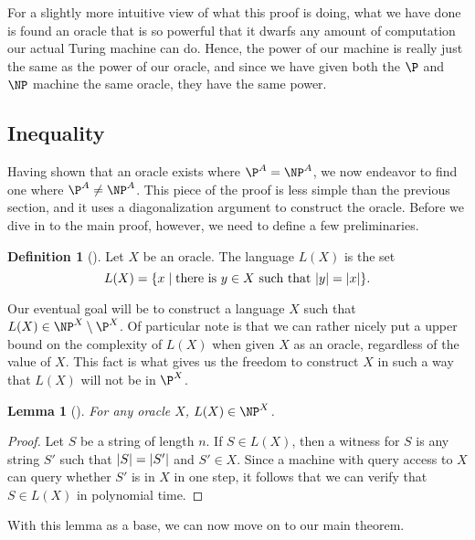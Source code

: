\documentclass{reedthesis}
\theoremstyle{plain}
\newtheorem{lemma}[thm]{Lemma}
\theoremstyle{definition}
\newtheorem{defn}[thm]{Definition}
\theoremstyle{remark}
\DeclarePairedDelimiter{\abs}{\lvert}{\rvert}
\numberwithin{equation}{section}
\begin{document}
For a slightly more intuitive view of what this proof is doing, what we have
done is found an oracle that is so powerful that it dwarfs any amount of
computation our actual Turing machine can do. Hence, the power of our machine is
really just the same as the power of our oracle, and since we have given both
the $\P$ and $\NP$ machine the same oracle, they have the same power.

\subsection{Inequality}

Having shown that an oracle exists where $\P^{A} = \NP^{A}$, we now endeavor to
find one where $\P^{A} \ne \NP^{A}$. This piece of the proof is less simple than
the previous section, and it uses a diagonalization argument to construct the
oracle. Before we dive in to the main proof, however, we need to define a few
preliminaries.

\begin{defn}[{\cite[436]{BGS75}}]\label{def:l(x)}
  Let $X$ be an oracle. The language $L(X)$ is the set
  \begin{equation*}
    L(X) = \{x \mid \text{there is } y \in X \text{ such that } \abs{y} = \abs{x}\}.
  \end{equation*}
\end{defn}

Our eventual goal will be to construct a language $X$ such that
$L(X) \in \NP^{X} \setminus \P^{X}$. Of particular note is that we can rather nicely put a
upper bound on the complexity of $L(X)$ when given $X$ as an oracle, regardless
of the value of $X$. This fact is what gives us the freedom to construct $X$ in
such a way that $L(X)$ will not be in $\P^{X}$.

\begin{lemma}[{\cite[436]{BGS75}}]\label{lem:l(x)-in--np}
  For any oracle $X$, $L(X) \in \NP^{X}$.
\end{lemma}

\begin{proof}
  Let $S$ be a string of length $n$. If $S \in L(X)$, then a witness for $S$ is
  any string $S'$ such that $\abs{S} = \abs{S'}$ and $S' \in X$. Since a machine
  with query access to $X$ can query whether $S'$ is in $X$ in one step, it
  follows that we can verify that $S \in L(X)$ in polynomial time.
\end{proof}

With this lemma as a base, we can now move on to our main theorem.
\end{document}
